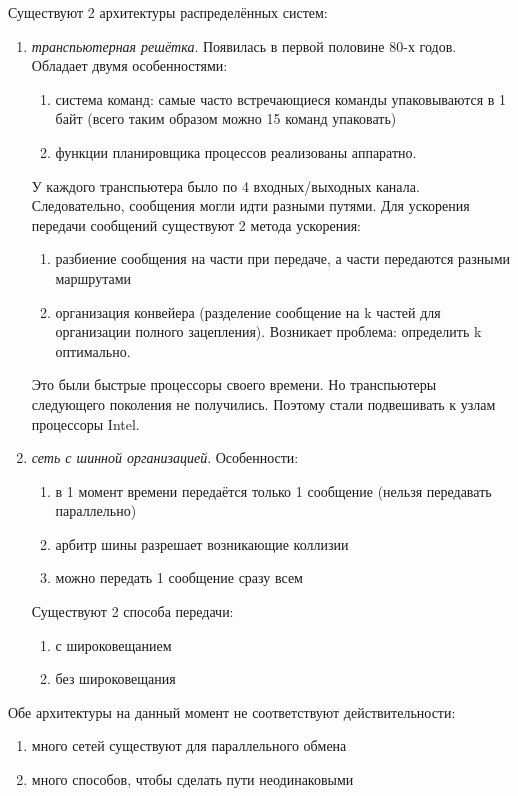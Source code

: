 \documentclass[a4paper,12pt]{article}
\begin{document}
	Существуют 2 архитектуры распределённых систем:
	\begin{enumerate}
		\item {\em транспьютерная решётка}. Появилась в первой половине 80-х годов. Обладает 
		двумя особенностями:
		\begin{enumerate}
			\item система команд: самые часто встречающиеся команды упаковываются в 1 байт 
			(всего таким образом можно 15 команд упаковать)
			\item функции планировщика процессов реализованы аппаратно.
		\end{enumerate}
		У каждого транспьютера было по 4 входных/выходных канала. Следовательно, сообщения
		могли идти разными путями. Для ускорения передачи сообщений существуют 2 метода 
		ускорения:
		\begin{enumerate}
			\item разбиение сообщения на части при передаче, а части передаются разными 
			маршрутами
			\item организация конвейера (разделение сообщение на k частей для организации 
			полного зацепления). Возникает проблема: определить k оптимально.
		\end{enumerate}
		Это были быстрые процессоры своего времени. Но транспьютеры следующего поколения не
		получились. Поэтому стали подвешивать к узлам процессоры Intel.
		\item {\em сеть с шинной организацией}.  Особенности:
		\begin{enumerate}
			\item в 1 момент времени передаётся только 1 сообщение (нельзя передавать 
			параллельно)
			\item арбитр шины разрешает возникающие коллизии
			\item можно передать 1 сообщение сразу всем
		\end{enumerate}
		Существуют 2 способа передачи:
		\begin{enumerate}
			\item с широковещанием
			\item без широковещания
		\end{enumerate}
	\end{enumerate}
	Обе архитектуры на данный момент не соответствуют действительности:
	\begin{enumerate}
		\item много сетей существуют для параллельного обмена
		\item много способов, чтобы сделать пути неодинаковыми
	\end{enumerate}
\end{document}
